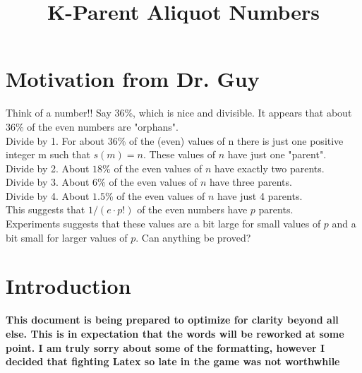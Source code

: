 \documentclass[12pt]{amsart}
\theoremstyle{definition}
\numberwithin{equation}{section}
\begin{document}

\baselineskip=17pt


\title{K-Parent Aliquot Numbers}




\date{}

\maketitle

\section{Motivation from Dr. Guy}
\noindent Think of a number!! Say $36$\%, which is nice and divisible. It appears that about $36$\% of the even numbers are "orphans". \\

\noindent Divide by 1. For about $36$\% of the (even) values of n there is just one positive integer m such that $s(m) = n$. These values of $n$ have just one "parent".\\

\noindent Divide by 2.  About $18$\% of the even values of $n$ have exactly two parents.\\

\noindent Divide by 3. About $6$\% of the even values of $n$ have three parents. \\

\noindent Divide by 4. About $1.5$\% of the even values of $n$ have just 4 parents.\\

\noindent This suggests that $1 / (e \cdot p!)$ of the even numbers have $p$ parents.\\

\noindent Experiments suggests that these values are a bit large for small values of $p$ and a bit small for larger values of $p$. Can anything be proved?\\

\section{Introduction}
\textbf{This document is being prepared to optimize for clarity beyond all else. This is in expectation that the words will be reworked at some point. I am truly sorry about some of the formatting, however I decided that fighting Latex so late in the game was not worthwhile}\\
\end{document}
